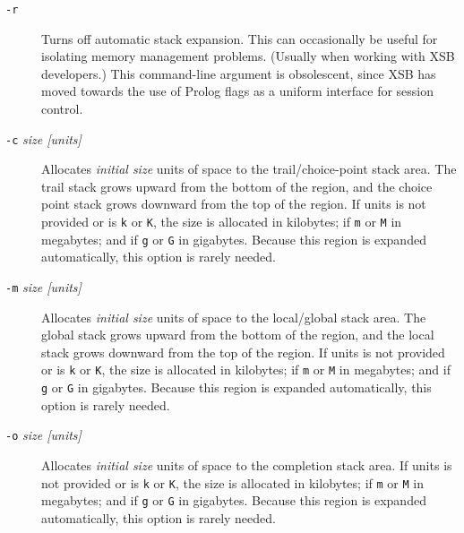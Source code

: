 \begin{description}
\item[{\tt -r}] Turns off automatic stack expansion.  This can
  occasionally be useful for isolating memory management problems.
  (Usually when working with XSB developers.)  This command-line
  argument is obsolescent, since XSB has moved towards the use of
  Prolog flags as a uniform interface for session control.

\item[{\tt -c} {\em size [units]}] Allocates {\em initial size\/}
  units of space to the trail/choice-point stack area.  The trail
  stack grows upward from the bottom of the region, and the choice
  point stack grows downward from the top of the region.  If units is
  not provided or is {\tt k} or {\tt K}, the size is allocated in
  kilobytes; if {\tt m} or {\tt M} in megabytes; and if {\tt g} or
  {\tt G} in gigabytes.  Because this region is expanded
  automatically, this option is rarely needed.
%
\item[{\tt -m} {\em size [units]}] Allocates {\em initial size\/}
  units of space to the local/global stack area.  The global stack
  grows upward from the bottom of the region, and the local stack
  grows downward from the top of the region.  If units is not provided
  or is {\tt k} or {\tt K}, the size is allocated in kilobytes; if
  {\tt m} or {\tt M} in megabytes; and if {\tt g} or {\tt G} in
  gigabytes.  Because this region is expanded automatically, this
  option is rarely needed.
%
\item[{\tt -o} {\em size [units]}] Allocates {\em initial size\/}
  units of space to the completion stack area.  If units is not
  provided or is {\tt k} or {\tt K}, the size is allocated in
  kilobytes; if {\tt m} or {\tt M} in megabytes; and if {\tt g} or
  {\tt G} in gigabytes.  Because this region is expanded
  automatically, this option is rarely needed.

%
%
%
\end{description}

